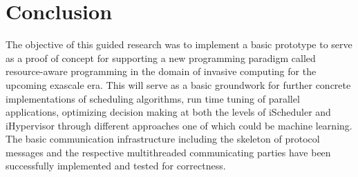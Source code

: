 \documentclass[a4paper, 12pt]{article}
\begin{document}
\section{Conclusion}
The objective of this guided research was to implement a basic prototype to serve as a proof of concept for supporting a new programming paradigm called resource-aware programming in the domain of invasive computing for the upcoming exascale era. This will serve as a basic groundwork for further concrete implementations of scheduling algorithms, run time tuning of parallel applications, optimizing decision making at both the levels of iScheduler and iHypervisor through different approaches one of which could be machine learning. The basic communication infrastructure including the skeleton of protocol messages and the respective multithreaded communicating parties have been successfully implemented and tested for correctness.
\nocite{fontaine,gao,poorzahedy2,tianze,leblanc,kuo,poorzahedy1,wen}



\end{document}
